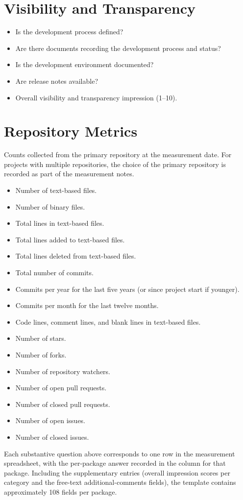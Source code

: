 \section*{Visibility and Transparency}

\begin{itemize}
    \item Is the development process defined?
    \item Are there documents recording the development process and status?
    \item Is the development environment documented?
    \item Are release notes available?
    \item Overall visibility and transparency impression (1--10).
\end{itemize}

\section*{Repository Metrics}

Counts collected from the primary repository at the measurement date. For projects with multiple repositories, the choice of the primary repository is recorded as part of the measurement notes.

\begin{itemize}
    \item Number of text-based files.
    \item Number of binary files.
    \item Total lines in text-based files.
    \item Total lines added to text-based files.
    \item Total lines deleted from text-based files.
    \item Total number of commits.
    \item Commits per year for the last five years (or since project start if younger).
    \item Commits per month for the last twelve months.
    \item Code lines, comment lines, and blank lines in text-based files.
    \item Number of stars.
    \item Number of forks.
    \item Number of repository watchers.
    \item Number of open pull requests.
    \item Number of closed pull requests.
    \item Number of open issues.
    \item Number of closed issues.
\end{itemize}

Each substantive question above corresponds to one row in the measurement spreadsheet, with the per-package answer recorded in the column for that package. Including the supplementary entries (overall impression scores per category and the free-text additional-comments fields), the template contains approximately 108 fields per package.
